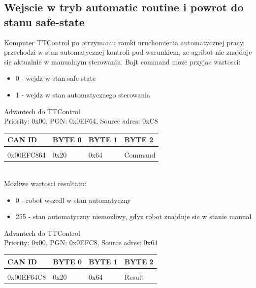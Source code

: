 \documentclass{article}
\begin{document}
\subsection{Wejscie w tryb automatic routine i powrot do stanu safe-state }

Komputer TTControl po otrzymaniu ramki uruchomienia automatycznej pracy, przechodzi w stan automatycznej kontroli pod warunkiem, ze agribot nie znajduje sie aktualnie w manualnym sterowaniu. Bajt command moze przyjac wartosci:
\begin{itemize}
\item 0 - wejdz w stan safe state
\item 1 - wejdz w stan automatycznego sterowania
\end{itemize}

Advantech do TTControl\\
Priority: 0x00, PGN: 0x0EF64, Source adres: 0xC8\\
\begin{left}
\begin{tabular}{ |p{2cm}|p{1.5cm}|p{2.0cm}|p{2.0cm}|}  
 \hline
 CAN ID & BYTE 0 & BYTE 1 & BYTE 2\\ \hline
 & & &\\
 0x00EFC864 & 0x20 & 0x64 & Command\\ 
 \hline
\end{tabular}
\end{left}\\

Mozliwe wartosci resultatu:
\begin{itemize}
\item 0 - robot wszedl w stan automatyczny
\item 255 - stan automatyczny niemozliwy, gdyz robot znajduje sie w stanie manual
\end{itemize}

Advantech do TTControl\\
Priority: 0x00, PGN: 0x0EFC8, Source adres: 0x64\\
\begin{left}
\begin{tabular}{ |p{2cm}|p{1.5cm}|p{2.0cm}|p{2.0cm}|}   
 \hline
 CAN ID & BYTE 0 & BYTE 1 & BYTE 2 \\ \hline
 & & &\\
 0x00EF64C8 & 0x20 & 0x64 & Result\\ 
 \hline
\end{tabular}
\end{left}\\
\end{document}
